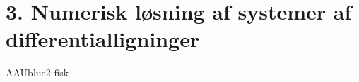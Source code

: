 \section*{3. Numerisk løsning af systemer af differentialligninger}
% 
%
\begin{color}{AAUblue2}
%
fisk
% 
\end{color}
\\\\
%



 
